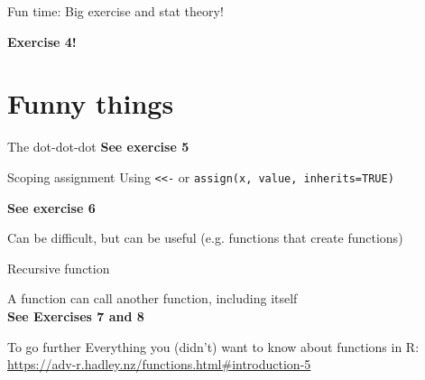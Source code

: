 \documentclass{beamer}\usepackage[]{graphicx}\usepackage[]{color}
\makeatletter
\newcommand{\hlnum}[1]{\textcolor[rgb]{0.686,0.059,0.569}{#1}}%
\newcommand{\hlopt}[1]{\textcolor[rgb]{0,0,0}{#1}}%
\newcommand{\hlstd}[1]{\textcolor[rgb]{0.345,0.345,0.345}{#1}}%
\newcommand{\hlkwa}[1]{\textcolor[rgb]{0.161,0.373,0.58}{\textbf{#1}}}%
\newcommand{\hlkwb}[1]{\textcolor[rgb]{0.69,0.353,0.396}{#1}}%
\newcommand{\hlkwc}[1]{\textcolor[rgb]{0.333,0.667,0.333}{#1}}%
\newcommand{\hlkwd}[1]{\textcolor[rgb]{0.737,0.353,0.396}{\textbf{#1}}}%
\newenvironment{kframe}{%
 \def\at@end@of@kframe{}%
 \ifinner\ifhmode%
  \def\at@end@of@kframe{\end{minipage}}%
  \begin{minipage}{\columnwidth}%
 \fi\fi%
 \def\FrameCommand##1{\hskip\@totalleftmargin \hskip-\fboxsep
 \colorbox{shadecolor}{##1}\hskip-\fboxsep
     \hskip-\linewidth \hskip-\@totalleftmargin \hskip\columnwidth}%
 \MakeFramed {\advance\hsize-\width
   \@totalleftmargin\z@ \linewidth\hsize
   \@setminipage}}%
 {\par\unskip\endMakeFramed%
 \at@end@of@kframe}
\newenvironment{knitrout}{}{} %
\makeatother
\begin{document}
\begin{frame}{Fun time: Big exercise and stat theory!}

\textbf{Exercise 4!}

\end{frame}

\section{Funny things}



\begin{frame}{The dot-dot-dot}
\textbf{See exercise 5}

\end{frame}

\begin{frame}[fragile]{Scoping assignment}
Using \texttt{<<-} or \texttt{assign(x, value, inherits=TRUE)}

\textbf{See exercise 6}

Can be difficult, but can be useful (e.g. functions that create functions)
\end{frame}

\begin{frame}[fragile]{Recursive function}

A function can call another function, including itself\\
\textbf{See Exercises 7 and 8}

\end{frame}


\begin{frame}{To go further}
Everything you (didn't) want to know about functions in R: \url{https://adv-r.hadley.nz/functions.html\#introduction-5}


\end{frame}
\end{document}

